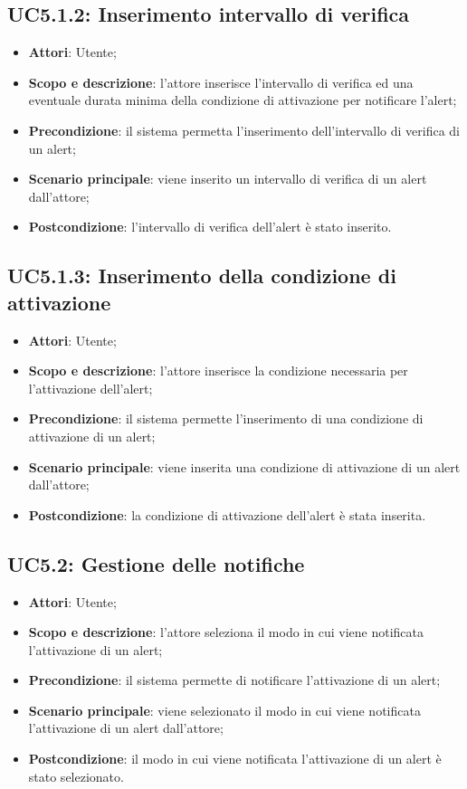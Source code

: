 \subsection{UC5.1.2: Inserimento intervallo di verifica}
\hypertarget{UC5.1.2}{}
\begin{itemize}
	\item \textbf{Attori}: Utente;
	\item \textbf{Scopo e descrizione}: l'attore inserisce l'intervallo di verifica ed una eventuale durata minima della condizione di attivazione per notificare l'alert;
	\item \textbf{Precondizione}: il sistema permetta l'inserimento dell'intervallo di verifica di un alert;
	\item \textbf{Scenario principale}: viene inserito un intervallo di verifica di un alert dall'attore;
	\item \textbf{Postcondizione}: l'intervallo di verifica dell'alert è stato inserito.
\end{itemize}

\subsection{UC5.1.3: Inserimento della condizione di attivazione}
\hypertarget{UC5.1.3}{}
\begin{itemize}
	\item \textbf{Attori}: Utente;
	\item \textbf{Scopo e descrizione}: l'attore inserisce la condizione necessaria per l'attivazione dell'alert;
	\item \textbf{Precondizione}: il sistema permette l'inserimento di una condizione di attivazione di un alert;
	\item \textbf{Scenario principale}: viene inserita una condizione di attivazione di un alert dall'attore;
	\item \textbf{Postcondizione}: la condizione di attivazione dell'alert è stata inserita.
\end{itemize}

\subsection{UC5.2: Gestione delle notifiche}
\hypertarget{UC5.2}{}
\begin{itemize}
	\item \textbf{Attori}: Utente;
	\item \textbf{Scopo e descrizione}: l'attore seleziona il modo in cui viene notificata l'attivazione di un alert;
	\item \textbf{Precondizione}: il sistema permette di notificare l'attivazione di un alert;
	\item \textbf{Scenario principale}: viene selezionato il modo in cui viene notificata l'attivazione di un alert dall'attore;
	\item \textbf{Postcondizione}: il modo in cui viene notificata l'attivazione di un alert è stato selezionato.
\end{itemize}
